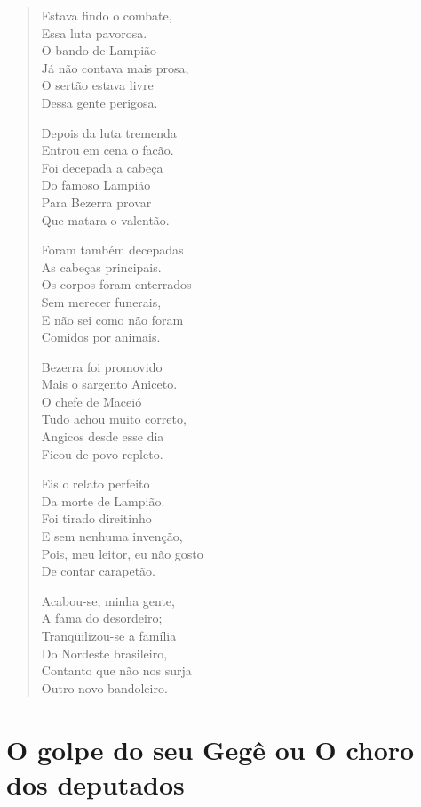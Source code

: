 \begin{verse}
Estava findo o combate,\\
Essa luta pavorosa.\\
O bando de Lampião\\
Já não contava mais prosa,\\
O sertão estava livre\\
Dessa gente perigosa.

Depois da luta tremenda\\
Entrou em cena o facão.\\
Foi decepada a cabeça \\
Do famoso Lampião\\
Para Bezerra provar\\
Que matara o valentão.

Foram também decepadas\\
As cabeças principais.\\
Os corpos foram enterrados\\
Sem merecer funerais,\\
E não sei como não foram\\
Comidos por animais.


Bezerra foi promovido\\
Mais o sargento Aniceto.\\
O chefe de Maceió\\
Tudo achou muito correto,\\
Angicos desde esse dia\\
Ficou de povo repleto.

Eis o relato perfeito\\
Da morte de Lampião.\\
Foi tirado direitinho\\
E sem nenhuma invenção,\\
Pois, meu leitor, eu não gosto\\
De contar carapetão.

Acabou-se, minha gente,\\
A fama do desordeiro;\\
Tranqüilizou-se a família\\
Do Nordeste brasileiro,\\
Contanto que não nos surja\\
Outro novo bandoleiro.
\end{verse}

\chapter{O golpe do seu Gegê ou O choro dos deputados}

